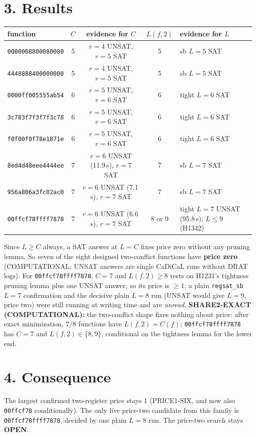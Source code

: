 \documentclass[11pt]{article}
\begin{document}
\section*{3. Results}
\begin{center}\small
\begin{tabular}{lcccl}
function & $C$ & evidence for $C$ & $L(f,2)$ & evidence for $L$\\\hline
\texttt{0000008800080080} & 5 & $r{=}4$ UNSAT, $r{=}5$ SAT & 5 & sb $L{=}5$ SAT\\
\texttt{4448888400000000} & 5 & $r{=}4$ UNSAT, $r{=}5$ SAT & 5 & sb $L{=}5$ SAT\\
\texttt{0000ff005555ab54} & 6 & $r{=}5$ UNSAT, $r{=}6$ SAT & 6 & tight $L{=}6$ SAT\\
\texttt{3c783f7f3f7f3c78} & 6 & $r{=}5$ UNSAT, $r{=}6$ SAT & 6 & tight $L{=}6$ SAT\\
\texttt{f0f00f0f78e1871e} & 6 & $r{=}5$ UNSAT, $r{=}6$ SAT & 6 & tight $L{=}6$ SAT\\
\texttt{8ed4d48eee4444ee} & 7 & $r{=}6$ UNSAT (11.9\,s), $r{=}7$ SAT & 7 & sb $L{=}7$ SAT\\
\texttt{956a806a3fc02ac0} & 7 & $r{=}6$ UNSAT (7.1\,s), $r{=}7$ SAT & 7 & sb $L{=}7$ SAT\\
\texttt{00ffcf78ffff7878} & 7 & $r{=}6$ UNSAT (6.6\,s), $r{=}7$ SAT & 8 or 9 & tight $L{=}7$ UNSAT (95.8\,s); $L\le9$ (H1342)\\
\end{tabular}
\end{center}
Since $L\ge C$ always, a SAT answer at $L=C$ fixes price zero without any pruning lemma. So seven of the eight designed two-conflict functions have \textbf{price zero} (COMPUTATIONAL; UNSAT answers are single CaDiCaL runs without DRAT logs). For \texttt{00ffcf78ffff7878}, $C=7$ and $L(f,2)\ge8$ rests on H1231's tightness pruning lemma plus one UNSAT answer, so its price is $\ge1$; a plain \texttt{regsat\_sb} $L=7$ confirmation and the decisive plain $L=8$ run (UNSAT would give $L=9$, price two) were still running at writing time and are \emph{unread}.
\textbf{SHARE2-EXACT (COMPUTATIONAL):} the two-conflict shape fixes nothing about price: after exact minimization, $7/8$ functions have $L(f,2)=C(f)$; \texttt{00ffcf78ffff7878} has $C=7$ and $L(f,2)\in\{8,9\}$, conditional on the tightness lemma for the lower end.
\section*{4. Consequence}
The largest confirmed two-register price stays $1$ (PRICE1-SIX, and now also \texttt{00ffcf78} conditionally). The only live price-two candidate from this family is \texttt{00ffcf78ffff7878}, decided by one plain $L=8$ run. The price-two search stays \textbf{OPEN}.
\end{document}
